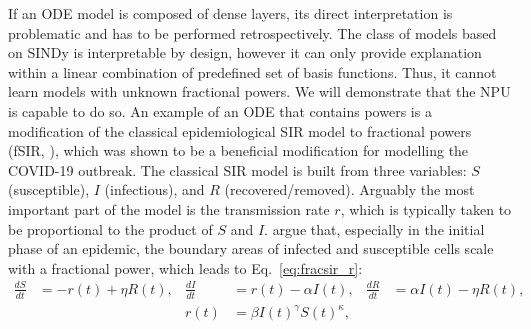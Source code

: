 \documentclass[9pt]{article}
\begin{document}
If an ODE model is composed of dense layers, its direct interpretation is
problematic and has to be performed retrospectively. The class of models based on
SINDy is interpretable by design, however it can only provide explanation
within a linear combination of predefined set of basis functions. Thus, it
cannot learn models with unknown fractional powers. We will demonstrate that the NPU
is capable to do so.
An example of an ODE that contains powers is a modification of the classical
epidemiological SIR model \citep{kermack1927contribution} to fractional powers
(fSIR, \cite{taghvaei_fractional_2020}), which was shown to be a beneficial
modification for modelling the COVID-19 outbreak.  The classical SIR model is
built from three variables: $S$ (susceptible), $I$ (infectious), and $R$
(recovered/removed).  Arguably the most important part of the model is the
transmission rate $r$, which is typically taken to be proportional to the
product of $S$ and $I$.  \citet{taghvaei_fractional_2020} argue that,
especially in the initial phase of an epidemic, the boundary areas of infected
and susceptible cells scale with a fractional power, which leads to
Eq.~\ref{eq:fracsir_r}:
\begin{align}
  \label{eq:fracsir}
  \frac{dS}{dt} &= -r(t) + \eta R(t), &
  \frac{dI}{dt} &=  r(t) - \alpha I(t), &
  \frac{dR}{dt} &= \alpha I(t) - \eta R(t),\\
  \label{eq:fracsir_r}
  & & r(t) &= \beta I(t)^\gamma S(t)^\kappa,
\end{align}
\end{document}

